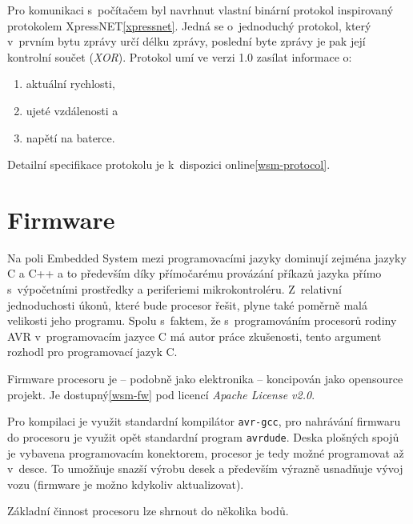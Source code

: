 Pro komunikaci s~počítačem byl navrhnut vlastní binární protokol inspirovaný
protokolem XpressNET\ref{xpressnet}. Jedná se o~jednoduchý protokol, který
v~prvním bytu zprávy určí délku zprávy, poslední byte zprávy je pak její
kontrolní součet (\textit{XOR}). Protokol umí ve verzi 1.0 zasílat informace o:

\begin{enumerate}
\item aktuální rychlosti,
\item ujeté vzdálenosti a
\item napětí na baterce.
\end{enumerate}

Detailní specifikace protokolu je k~dispozici online\ref{wsm-protocol}.

\section{Firmware}
\label{sec:wsm-fw}

Na poli Embedded System mezi programovacími jazyky dominují zejména jazyky
C a C++ a to především díky přímočarému provázání příkazů jazyka přímo
s~výpočetními prostředky a periferiemi mikrokontroléru. Z~relativní jednoduchosti
úkonů, které bude procesor řešit, plyne také poměrně malá velikosti jeho
programu. Spolu s~faktem, že s~programováním procesorů rodiny AVR
v~programovacím jazyce C má autor práce zkušenosti, tento argument rozhodl pro
programovací jazyk C.

Firmware procesoru je -- podobně jako elektronika -- koncipován jako opensource
projekt. Je dostupný\ref{wsm-fw} pod licencí \textit{Apache License v2.0}.

Pro kompilaci je využit standardní kompilátor \texttt{avr-gcc}, pro nahrávání
firmwaru do procesoru je využit opět standardní program \texttt{avrdude}. Deska
plošných spojů je vybavena programovacím konektorem, procesor je tedy možné
programovat až v~desce. To umožňuje snazší výrobu desek a především výrazně
usnadňuje vývoj vozu (firmware je možno kdykoliv aktualizovat).

Základní činnost procesoru lze shrnout do několika bodů.

